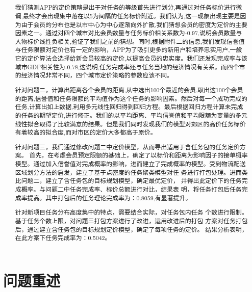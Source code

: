 \documentclass{cumcmthesis}
\title{ }
\begin{document}
 \maketitle
 \begin{abstract}
我们猜测APP的定价策略是出于对任务的等级首先进行划分,再通过对任务标价进行微调,最终才会出现集中落在以5为间隔的任务标价附近。我们认为,这一现象出现主要是因为由于会员的分布也是以市中心为中心逐渐向外扩散,我们猜想会员的密度为定价的主要因素之一。通过对四个城市对比会员数量与任务标价相关系数为-0.97,说明会员数量与人物标价线性负相关,验证了我们之前的猜想。同时,根据附件二的信息,我们发现信誉值与任务限额对定价也有一定的影响，APP为了吸引更多的新用户和培养忠实用户,一般它的定价算法会选择给新会员较高的定价,以提高会员的忠实度。我们还发现完成率与该城市GDP相关性为-0.78,这说明,任务完成率还与任务当地的经济情况有关系。而四个市的经济情况非常不同，四个城市定价策略的参数应该不同。

针对问题二，计算出距离各个会员的距离,从中选出100个最近的会员,取出这100个会员的距离,信誉值和任务限额的平均值作为这个任务的影响因素。然后对每一个成功完成的任务,计算出如上数据,利用多元线性回归得到回归方程。最后根据回归方程计算未完成的任务的期望定价,进行修正。我们的以平均距离、平均信誉值和平均限额为变量的多元线性拟合取得了比较满意的结果。但是我们同时发现我们的模型对郊区的高价任务标价有着较高的拟合度,而对市区的定价大多都高于原价。

针对问题三，我们通过修改问题二中定价模型，从而导出适用于含任务包的任务定价方案。 首先，在考虑会员预定限额的基础上，确定了以标价和距离为影响因子的接单概率模型。通过加入信誉值对完成概率的影响，进而建立了完成概率的模型。受到物流配送区域划分方法的启发，建立了基于点密度的任务聚类模型对任 务进行打包处理。进而类比问题二，建立了含任务包的目标规划模型，确定最优定价， 并得出此定价下的任务完成概率。与问题二中任务完成率、标价总额进行对比，结果表 明，将任务打包后任务完成率提高。其中打包后的任务理论完成率为：0.8059,有显著提升。

针对新项目任务分布高度集中的特点，需要结合实际，对任务包内任务 个数进行限制。基于任务个数上限，对问题三打包方案进行了改进，运用改进后的打包 方案对任务打包后，通过建立含任务包的目标规划定价模型，确定了每项任务的定价。 结果分析表明，在此方案下任务完成率为：0.5042。



\end{abstract}




\tableofcontents

\section{问题重述}
\end{document}
